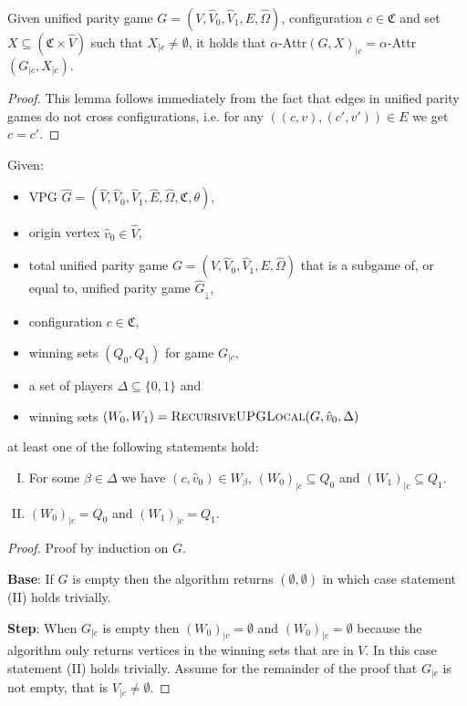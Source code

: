 \begin{lemma}
	\label{lem_projected_attr_is_attr_of_projected}
	Given unified parity game $G = (V,\hat{V}_0,\hat{V}_1,E,\hat{\Omega})$, configuration $c \in \mathfrak{C}$ and set $X \subseteq (\mathfrak{C} \times \hat{V})$ such that $X_{|c} \neq \emptyset$, it holds that $\alpha$-Attr$(G,X)_{|c}= \alpha$-Attr$(G_{|c},X_{|c})$.
	\begin{proof}
		This lemma follows immediately from the fact that edges in unified parity games do not cross configurations, i.e. for any $((c,v),(c',v')) \in E$ we get $c = c'$.
	\end{proof}
\end{lemma}
\begin{theorem}
	Given:
	\begin{itemize}
		\item VPG $\hat{G} = (\hat{V}, \hat{V}_0,\hat{V}_1,\hat{E},\hat{\Omega},\mathfrak{C},\theta)$,
		\item origin vertex $\hat{v}_0 \in \hat{V}$,
		\item total unified parity game $G = (V, \hat{V}_0, \hat{V}_1,E,\hat{\Omega})$ that is a subgame of, or equal to, unified parity game $\hat{G}_{\downarrow}$,
		\item configuration $c\in \mathfrak{C}$,
		\item winning sets $(Q_0,Q_1)$ for game $G_{|c}$,
		\item a set of players $\Delta \subseteq \{0,1\}$ and
		\item winning sets $(W_0, W_1) = \textsc{RecursiveUPGLocal}(G,\hat{v}_0,\Delta)$
	\end{itemize}
	at least one of the following statements hold:
	\begin{enumerate}[(I)]
		\item For some $\beta \in \Delta$ we have $(c,\hat{v}_0) \in W_\beta$, $(W_0)_{|c} \subseteq Q_0$ and $(W_1)_{|c} \subseteq Q_1$.
		\item $(W_0)_{|c} = Q_0$ and $(W_1)_{|c} = Q_1$.
	\end{enumerate}
	\begin{proof}
		Proof by induction on $G$.
		
		\textbf{Base}: If $G$ is empty then the algorithm returns $(\emptyset,\emptyset)$ in which case statement (II) holds trivially.
		
		\textbf{Step}:
		When $G_{|c}$ is empty then $(W_0)_{|c} = \emptyset$ and $(W_0)_{|c} = \emptyset$ because the algorithm only returns vertices in the winning sets that are in $V$. In this case statement (II) holds trivially. Assume for the remainder of the proof that $G_{|c}$ is not empty, that is $V_{|c} \neq \emptyset$.
		

\end{proof}
\end{theorem}
